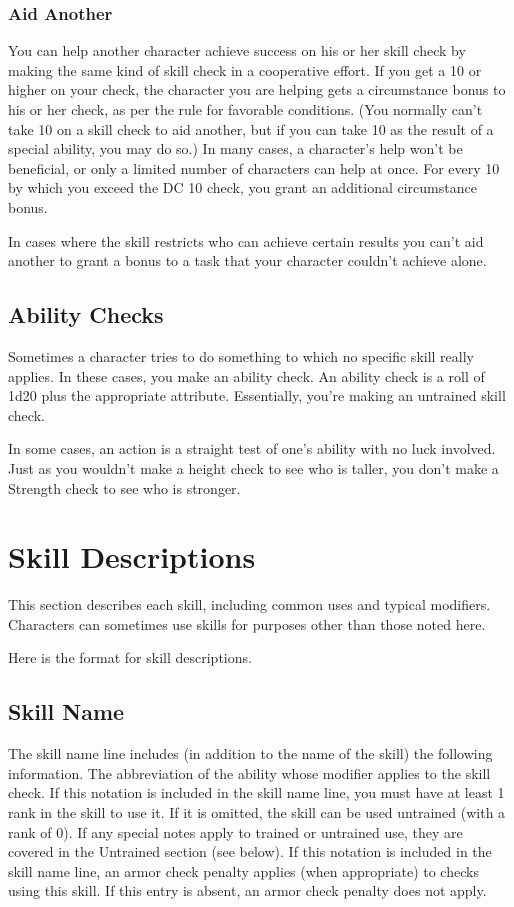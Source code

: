 \subsubsection{Aid Another}
You can help another character achieve success on his or her skill check by making the same kind of skill check in a cooperative effort. If you get a 10 or higher on your check, the character you are helping gets a  circumstance bonus to his or her check, as per the rule for favorable conditions. (You normally can't take 10 on a skill check to aid another, but if you can take 10 as the result of a special ability, you may do so.) In many cases, a character's help won't be beneficial, or only a limited number of characters can help at once. For every 10 by which you exceed the DC 10 check, you grant an additional  circumstance bonus.

In cases where the skill restricts who can achieve certain results you can't aid another to grant a bonus to a task that your character couldn't achieve alone.

\subsection{Ability Checks}
Sometimes a character tries to do something to which no specific skill really applies. In these cases, you make an ability check. An ability check is a roll of 1d20 plus the appropriate attribute. Essentially, you're making an untrained skill check.

In some cases, an action is a straight test of one's ability with no luck involved. Just as you wouldn't make a height check to see who is taller, you don't make a Strength check to see who is stronger.

\section{Skill Descriptions}
This section describes each skill, including common uses and typical modifiers. Characters can sometimes use skills for purposes other than those noted here.

Here is the format for skill descriptions.

\subsection*{Skill Name}
The skill name line includes (in addition to the name of the skill) the following information.
 The abbreviation of the ability whose modifier applies to the skill check.
 If this notation is included in the skill name line, you must have at least 1 rank in the skill to use it. If it is omitted, the skill can be used untrained (with a rank of 0). If any special notes apply to trained or untrained use, they are covered in the Untrained section (see below).
 If this notation is included in the skill name line, an armor check penalty applies (when appropriate) to checks using this skill. If this entry is absent, an armor check penalty does not apply.

